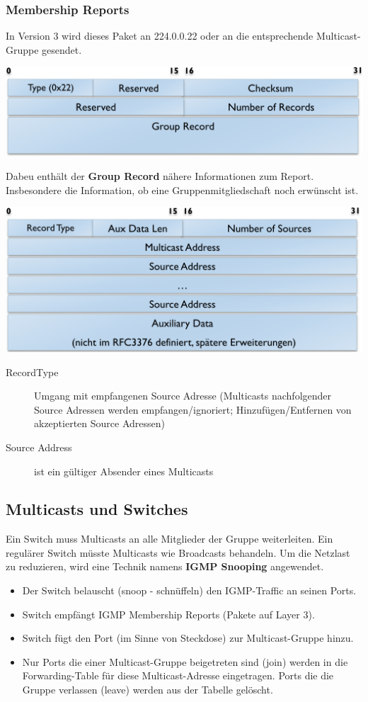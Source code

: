 \documentclass{article} %
\begin{document}
\subsubsection{Membership Reports}
In Version 3 wird dieses Paket an 224.0.0.22 oder an die entsprechende Multicast-Gruppe gesendet.
	\begin{center}
		\includegraphics[width=14cm]{img/igmpMRP.png}
	\end{center}
Dabeu enthält der \textbf{Group Record} nähere Informationen zum Report. Insbesondere die Information, ob eine Gruppenmitgliedschaft noch erwünscht ist. 
	\begin{center}
		\includegraphics[width=14cm]{img/igmpGR.png}
	\end{center}
	\begin{description}
	\item[RecordType] Umgang mit empfangenen Source Adresse (Multicasts nachfolgender Source Adressen werden empfangen/ignoriert; Hinzufügen/Entfernen von akzeptierten Source Adressen)
	\item[Source Address] ist ein gültiger Absender eines Multicasts
	\end{description}
\subsection{Multicasts und Switches}
Ein Switch  muss Multicasts an alle Mitglieder der Gruppe weiterleiten. Ein regulärer Switch müsste Multicasts wie Broadcasts behandeln. Um die Netzlast zu reduzieren, wird eine Technik namens \textbf{IGMP Snooping} angewendet. 
	\begin{itemize}
	\item Der Switch belauscht (snoop - schnüffeln) den IGMP-Traffic an seinen Ports.
	\item Switch empfängt IGMP Membership Reports (Pakete auf Layer 3). 
	\item Switch fügt den Port (im Sinne von Steckdose) zur Multicast-Gruppe hinzu. 
	\item Nur Ports die einer Multicast-Gruppe beigetreten sind (join) werden in die Forwarding-Table für diese Multicast-Adresse eingetragen. Ports die die Gruppe verlassen (leave) werden aus der Tabelle gelöscht.
	\end{itemize}
	
\end{document}
